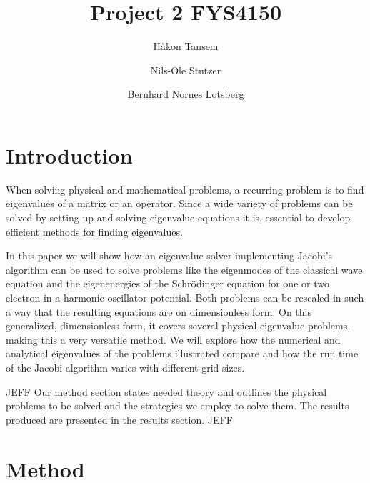 \documentclass[twocolumn]{aastex62}
\begin{document}
\title{Project 2 FYS4150}




\author{Håkon Tansem}

\author{Nils-Ole Stutzer}

\author{Bernhard Nornes Lotsberg}

\begin{abstract}

\end{abstract}

\section{Introduction} \label{sec:intro}
When solving physical and mathematical problems, a recurring problem is to find eigenvalues of a matrix or an operator. Since a wide variety of problems can be solved by setting up and solving eigenvalue equations it is, essential to develop efficient methods for finding eigenvalues. 

In this paper we will show how an eigenvalue solver implementing Jacobi's algorithm can be used to solve problems like the eigenmodes of the classical wave equation and the eigenenergies of the Schrödinger equation for one or two electron in a harmonic oscillator potential. Both problems can be rescaled in such a way that the resulting equations are on dimensionless form. On this generalized, dimensionless form, it covers several physical eigenvalue problems, making this a very versatile method. We will explore how the numerical and analytical eigenvalues of the problems illustrated compare and how the run time of the Jacobi algorithm varies with different grid sizes.

JEFF Our method section states needed theory and outlines the physical problems to be solved and the strategies we employ to solve them. The results produced are presented in the results section. JEFF   

\section{Method} \label{sec:method}
\end{document}
